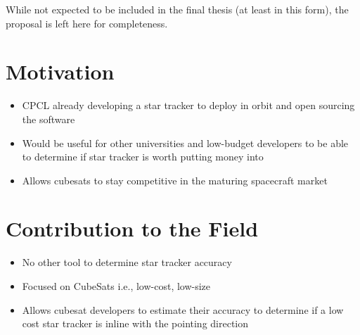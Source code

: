 \par \qquad While not expected to be included in the final thesis (at least in this form), the proposal is left here for completeness.

\section{Motivation}
\begin{itemize}
    \item CPCL already developing a star tracker to deploy in orbit and open sourcing the software 
    \item Would be useful for other universities and low-budget developers to be able to determine if star tracker is worth putting money into 
    \item Allows cubesats to stay competitive in the maturing spacecraft market 
\end{itemize}

\section{Contribution to the Field}
\begin{itemize}
    \item No other tool to determine star tracker accuracy 
    \item Focused on CubeSats i.e., low-cost, low-size 
    \item Allows cubesat developers to estimate their accuracy to determine if a low cost star tracker is inline with the pointing direction
\end{itemize}

